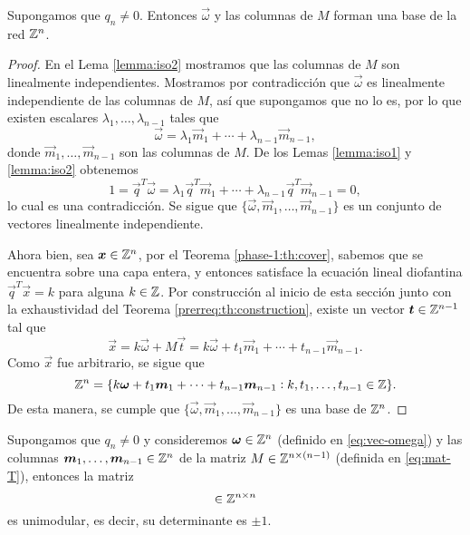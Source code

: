 \begin{theorem}
	\label{th:lattice}
	Supongamos que $q_n \neq 0$. Entonces $\vec{\omega}$ y las columnas de $M$ forman una base
	de la red $\mathbb{Z}^n$.
\end{theorem}
\begin{proof}
	En el Lema \ref{lemma:iso2} mostramos que las columnas de $M$ son linealmente independientes.
	Mostramos por contradicción que $\vec{\omega}$ es linealmente independiente de las columnas de
	$M$, así que supongamos que no lo es, por lo que existen escalares $\lambda_1, \ldots,
	\lambda_{n-1}$ tales que
	\begin{equation*}
		\vec{\omega} = \lambda_1 \vec{m}_1 + \cdots + \lambda_{n-1} \vec{m}_{n-1},
	\end{equation*}
	donde $\vec{m}_1, \ldots, \vec{m}_{n-1}$ son las columnas de $M$. De los Lemas \ref{lemma:iso1}
	y \ref{lemma:iso2} obtenemos
	\begin{equation*}
		1 = \vec{q}^T\vec{\omega} = \lambda_1 \vec{q}^T\vec{m}_1 + \cdots + \lambda_{n-1}
		\vec{q}^T\vec{m}_{n-1} = 0,
	\end{equation*}
	lo cual es una contradicción. Se sigue que $\lbrace \vec{\omega}, \vec{m}_1, \ldots,
	\vec{m}_{n-1}\rbrace$ es un conjunto de vectores linealmente independiente.

	Ahora bien, sea $\boldsymbol{x} \in \mathbb{Z}^n$, por el Teorema \ref{phase-1:th:cover}, sabemos que se
	encuentra sobre una capa entera, y entonces satisface la ecuación lineal diofantina
	$\vec{q}^T\vec{x} = k$ para alguna $k \in \mathbb{Z}$. Por construcción al inicio de esta sección junto
	con la exhaustividad del Teorema \ref{prerreq:th:construction}, existe un vector $\boldsymbol{t} \in
	\mathbb{Z}^{n-1}$ tal que
	\begin{equation*}
		\vec{x} = k\vec{\omega} + M\vec{t} = k\vec{\omega} + t_1\vec{m}_1 + \cdots +
		t_{n-1}\vec{m}_{n-1}.
	\end{equation*}
	Como $\vec{x}$ fue arbitrario, se sigue que
	\begin{equation*}
		\mathbb{Z}^n = \lbrace
		k\boldsymbol{\omega} + t_1\boldsymbol{m}_1 + \cdots + t_{n-1}\boldsymbol{m}_{n-1}
		\vcentcolon k, t_1, \ldots, t_{n-1} \in \mathbb{Z}
		\rbrace.
	\end{equation*}
	De esta manera, se cumple que $\lbrace \vec{\omega}, \vec{m}_1, \ldots, \vec{m}_{n-1}\rbrace$ es
	una base de $\mathbb{Z}^n$.
\end{proof}

\begin{corollary}
	Supongamos que $q_n \neq 0$ y consideremos $\boldsymbol{\omega} \in \mathbb{Z}^n$ (definido en
	\eqref{eq:vec-omega}) y las columnas $\boldsymbol{m}_1, \ldots, \boldsymbol{m}_{n-1} \in \mathbb{Z}^n$ de la matriz $M
	\in \mathbb{Z}^{n \times (n-1)}$ (definida en \eqref{eq:mat-T}), entonces la matriz
	\begin{equation*}
		[ \vec{\omega} \mid \vec{m}_1 \mid \cdots \mid \vec{m}_{n-1} ] \in \Z^{n \times n}
	\end{equation*}
	es unimodular, es decir, su determinante es $\pm 1$.
\end{corollary}

